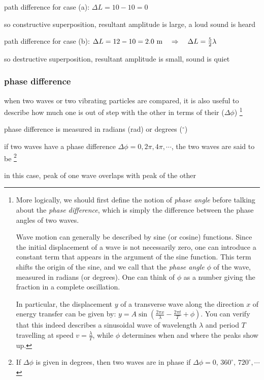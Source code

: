 \sol path difference for case (a): $\Delta L = 10 - 10  = 0$

so constructive superposition, resultant amplitude is large, a loud sound is heard

path difference for case (b): $\Delta L = 12 - 10 = 2.0 \text{ m} \quad \Rightarrow \quad \Delta L = \frac{5}{2}\lambda$

so destructive superposition, resultant amplitude is small, sound is quiet \eoe




\subsubsection{phase difference}

when two waves or two vibrating particles are compared, it is also useful to describe how much one is out of step with the other in terms of their  ($\Delta \phi$)
\footnote{More logically, we should first define the notion of \emph{phase angle} before talking about the \emph{phase difference}, which is simply the difference between the phase angles of two waves.
	
	Wave motion can generally be described by sine (or cosine) functions. Since the initial displacement of a wave is not necessarily zero, one can introduce a constant term that appears in the argument of the sine function. This term shifts the origin of the sine, and we call that the \emph{phase angle} $\phi$ of the wave, measured in radians (or degrees). One can think of $\phi$ as a number giving the fraction in a complete oscillation.
	
	In particular, the displacement $y$ of a transverse wave along the direction $x$ of energy transfer can be given by: $y = A \sin\left( \frac{2\pi x}{\lambda} - \frac{2\pi t}{T} + \phi \right)$. You can verify that this indeed describes a sinusoidal wave of wavelength $\lambda$ and period $T$ travelling at speed $v = \frac{\lambda}{T}$, while $\phi$ determines when and where the peaks show up.}

\cmt phase difference is measured in radians (rad) or degrees ($^\circ$)

\cmt if two waves have a phase difference $\Delta \phi = 0,2\pi,4\pi,\cdots$, the two waves are said to be \footnote{If $\Delta \phi$ is given in degrees, then two waves are in phase if $\Delta \phi = 0, \, 360^\circ, \, 720^\circ, \cdots$}

in this case, peak of one wave overlaps with peak of the other


